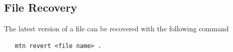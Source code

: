 \documentclass[12pt]{article}
\begin{document}
\subsection{File Recovery}

The latest version of a file can be recovered with the following command
\begin{verbatim}
   mtn revert <file name> .
\end{verbatim}
\end{document}
